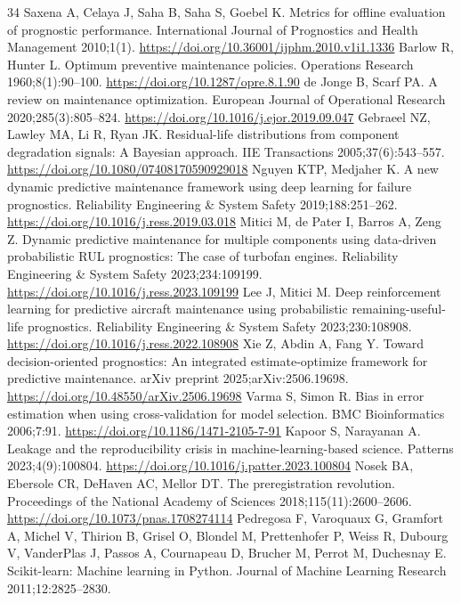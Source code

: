 \documentclass[a4paper,fleqn,doubleblind]{cas-dc}
\begin{document}
\begin{thebibliography}{34}
 Saxena A, Celaya J, Saha B, Saha S, Goebel K. Metrics for offline evaluation of prognostic performance. International Journal of Prognostics and Health Management 2010;1(1). \url{https://doi.org/10.36001/ijphm.2010.v1i1.1336}
 Barlow R, Hunter L. Optimum preventive maintenance policies. Operations Research 1960;8(1):90--100. \url{https://doi.org/10.1287/opre.8.1.90}
 de Jonge B, Scarf PA. A review on maintenance optimization. European Journal of Operational Research 2020;285(3):805--824. \url{https://doi.org/10.1016/j.ejor.2019.09.047}
 Gebraeel NZ, Lawley MA, Li R, Ryan JK. Residual-life distributions from component degradation signals: A Bayesian approach. IIE Transactions 2005;37(6):543--557. \url{https://doi.org/10.1080/07408170590929018}
 Nguyen KTP, Medjaher K. A new dynamic predictive maintenance framework using deep learning for failure prognostics. Reliability Engineering \& System Safety 2019;188:251--262. \url{https://doi.org/10.1016/j.ress.2019.03.018}
 Mitici M, de Pater I, Barros A, Zeng Z. Dynamic predictive maintenance for multiple components using data-driven probabilistic RUL prognostics: The case of turbofan engines. Reliability Engineering \& System Safety 2023;234:109199. \url{https://doi.org/10.1016/j.ress.2023.109199}
 Lee J, Mitici M. Deep reinforcement learning for predictive aircraft maintenance using probabilistic remaining-useful-life prognostics. Reliability Engineering \& System Safety 2023;230:108908. \url{https://doi.org/10.1016/j.ress.2022.108908}
 Xie Z, Abdin A, Fang Y. Toward decision-oriented prognostics: An integrated estimate-optimize framework for predictive maintenance. arXiv preprint 2025;arXiv:2506.19698. \url{https://doi.org/10.48550/arXiv.2506.19698}
 Varma S, Simon R. Bias in error estimation when using cross-validation for model selection. BMC Bioinformatics 2006;7:91. \url{https://doi.org/10.1186/1471-2105-7-91}
 Kapoor S, Narayanan A. Leakage and the reproducibility crisis in machine-learning-based science. Patterns 2023;4(9):100804. \url{https://doi.org/10.1016/j.patter.2023.100804}
 Nosek BA, Ebersole CR, DeHaven AC, Mellor DT. The preregistration revolution. Proceedings of the National Academy of Sciences 2018;115(11):2600--2606. \url{https://doi.org/10.1073/pnas.1708274114}
 Pedregosa F, Varoquaux G, Gramfort A, Michel V, Thirion B, Grisel O, Blondel M, Prettenhofer P, Weiss R, Dubourg V, VanderPlas J, Passos A, Cournapeau D, Brucher M, Perrot M, Duchesnay E. Scikit-learn: Machine learning in Python. Journal of Machine Learning Research 2011;12:2825--2830.

\end{thebibliography}
\end{document}

